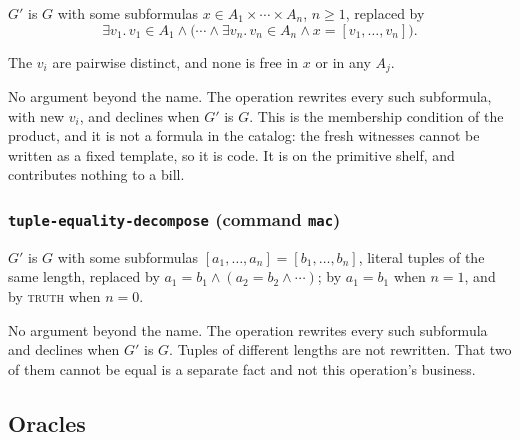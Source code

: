 \label{kop:cartesian-decompose}%
\begin{VNBcond}
\item[Rewrite] $G'$ is $G$ with some subformulas
  $x \in A_1 \times \cdots \times A_n$, $n \geq 1$, replaced by
  \[
    \exists v_1.\, v_1 \in A_1 \wedge
    \bigl(\cdots \wedge
    \exists v_n.\, v_n \in A_n \wedge x = [v_1, \ldots, v_n] \bigr).
  \]
\item[Freshness] The $v_i$ are pairwise distinct, and none is free in
  $x$ or in any $A_j$.
\end{VNBcond}
No argument beyond the name.  The operation rewrites every such
subformula, with new $v_i$, and declines when $G'$ is $G$.  This is the
membership condition of the product, and it is not a formula in the
catalog: the fresh witnesses cannot be written as a fixed template, so it
is code.  It is on the primitive shelf, and contributes nothing to a
bill.

\subsubsection*{\texttt{tuple-equality-decompose} (command \texttt{mac})}

\label{kop:tuple-equality-decompose}%
\begin{VNBcond}
\item[Rewrite] $G'$ is $G$ with some subformulas
  $[a_1, \ldots, a_n] = [b_1, \ldots, b_n]$, literal tuples of the same
  length, replaced by $a_1 = b_1 \wedge (a_2 = b_2 \wedge \cdots)$; by
  $a_1 = b_1$ when $n = 1$, and by \textsc{truth} when $n = 0$.
\end{VNBcond}
No argument beyond the name.  The operation rewrites every such
subformula and declines when $G'$ is $G$.  Tuples of different lengths
are not rewritten.  That two of them cannot be equal is a separate fact
and not this operation's business.

\subsection{Oracles}\label{sec:oracles}

